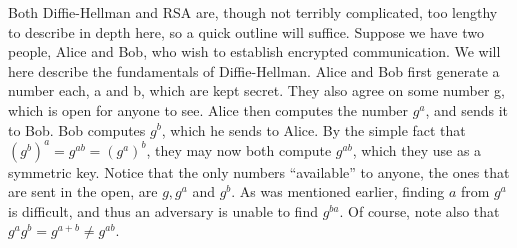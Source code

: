 \documentclass[conference]{IEEEtran}
\begin{document}
Both Diffie-Hellman and RSA are, though not terribly complicated, too lengthy to describe in depth here, so a quick outline will suffice.
Suppose we have two people, Alice and Bob, who wish to establish encrypted communication.
We will here describe the fundamentals of Diffie-Hellman\cite{diffieHellman}.
Alice and Bob first generate a number each, a and b, which are kept secret.
They also agree on some number g, which is open for anyone to see.
Alice then computes the number $g^a$, and sends it to Bob.
Bob computes $g^b$, which he sends to Alice.
By the simple fact that $(g^b)^a = g^{ab} = (g^a)^b$, they may now both compute $g^{ab}$, which they use as a symmetric key.
Notice that the only numbers ``available'' to anyone, the ones that are sent in the open, are $g, g^a$ and $g^b$.
As was mentioned earlier, finding $a$ from $g^a$ is difficult, and thus an adversary is unable to find $g^{ba}$.
Of course, note also that $g^a g^b = g^{a+b}\neq g^{ab}$.

\end{document}
